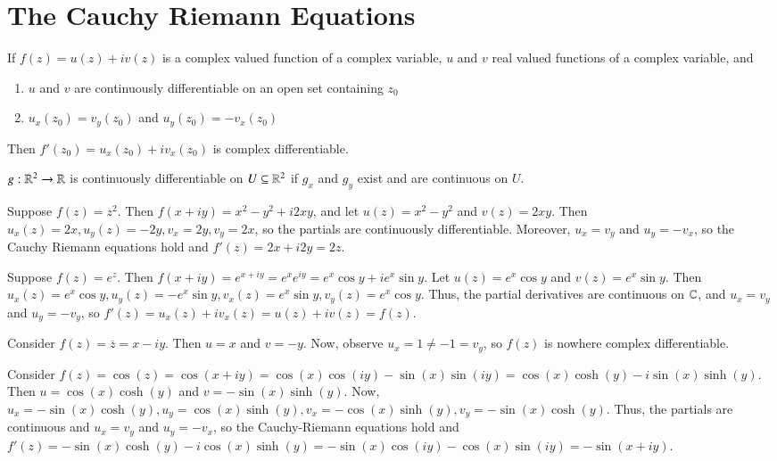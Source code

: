 \documentclass[12pt, a4paper, oneside, openright, titlepage]{book}
\begin{document}
\section{The Cauchy Riemann Equations}

\begin{thm}
    If $f(z) = u(z) + iv(z)$ is a complex valued function of a complex variable, $u$ and $v$ real valued functions of a complex variable, and \begin{enumerate}
        \item $u$ and $v$ are continuously differentiable on an open set containing $z_0$
        \item $u_x(z_0) = v_y(z_0)$ and $u_y(z_0) = -v_x(z_0)$
    \end{enumerate}
    Then $f'(z_0) = u_x(z_0)+iv_x(z_0)$ is complex differentiable.
\end{thm}

\begin{defn}
    $g:\mathbb R^2\rightarrow \mathbb R$ is continuously differentiable on $U \subseteq \mathbb R^2$ if $g_x$ and $g_y$ exist and are continuous on $U$.
\end{defn}

\begin{eg}
    Suppose $f(z) = z^2$. Then $f(x+iy) = x^2-y^2 + i2xy$, and let $u(z) = x^2-y^2$ and $v(z) = 2xy$. Then $u_x(z) = 2x, u_y(z) = -2y, v_x = 2y, v_y = 2x$, so the partials are continuously differentiable. Moreover, $u_x = v_y$ and $u_y = -v_x$, so the Cauchy Riemann equations hold and $f'(z) = 2x+i2y = 2z$.
\end{eg}

\begin{eg}
    Suppose $f(z) = e^z$. Then $f(x+iy) = e^{x+iy} = e^xe^{iy} = e^x\cos y + ie^x\sin y$. Let $u(z) = e^x\cos y$ and $v(z) = e^x\sin y$. Then $u_x(z) = e^x\cos y, u_y(z) = -e^x\sin y, v_x(z) = e^x\sin y, v_y(z) = e^x\cos y$. Thus, the partial derivatives are continuous on $\mathbb C$, and $u_x = v_y$ and $u_y = -v_y$, so $f'(z) = u_x(z)+iv_x(z) = u(z)+iv(z) = f(z)$.
\end{eg}

\begin{eg}
    Consider $f(z) = \overline{z} = x-iy$. Then $u = x$ and $v = -y$. Now, observe $u_x = 1 \neq -1 = v_y$, so $f(z)$ is nowhere complex differentiable.
\end{eg}


\begin{eg}
    Consider $f(z) = \cos(z) = \cos(x+iy) = \cos(x)\cos(iy)-\sin(x)\sin(iy) = \cos(x)\cosh(y) - i\sin(x)\sinh(y)$. Then $u = \cos(x)\cosh(y)$ and $v = -\sin(x)\sinh(y)$. Now, $u_x = -\sin(x)\cosh(y), u_y = \cos(x)\sinh(y), v_x = -\cos(x)\sinh(y), v_y = -\sin(x)\cosh(y)$. Thus, the partials are continuous and $u_x = v_y$ and $u_y = -v_x$, so the Cauchy-Riemann equations hold and $f'(z) = -\sin(x)\cosh(y)-i\cos(x)\sinh(y) = -\sin(x)\cos(iy)-\cos(x)\sin(iy) = -\sin(x+iy)$.
\end{eg}
\end{document}
